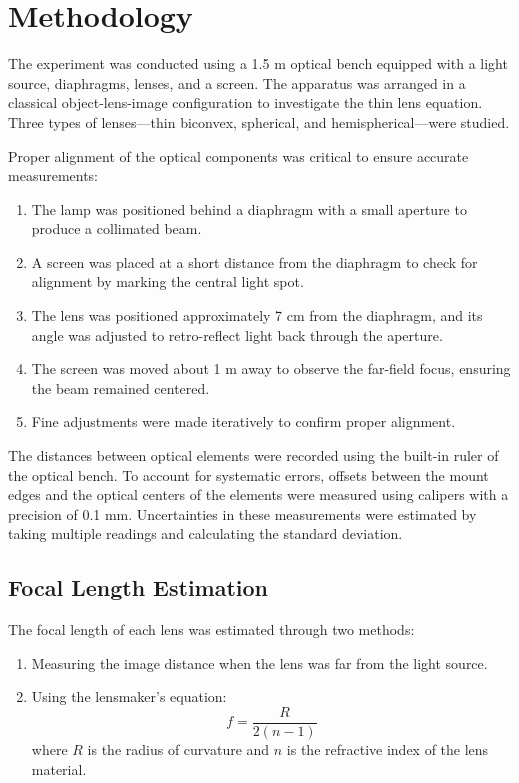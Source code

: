 \documentclass[aip, cp, amsmath, amssymb, reprint, nofootinbib]{revtex4-2}
\begin{document}
    \section{Methodology}

        The experiment was conducted using a 1.5 m optical bench equipped with a light source, diaphragms, lenses, and a screen. The apparatus was arranged in a classical object-lens-image configuration to investigate the thin lens equation. Three types of lenses—thin biconvex, spherical, and hemispherical—were studied.

        Proper alignment of the optical components was critical to ensure accurate measurements:

        \begin{enumerate}
            \item The lamp was positioned behind a diaphragm with a small aperture to produce a collimated beam.
            \item A screen was placed at a short distance from the diaphragm to check for alignment by marking the central light spot.
            \item The lens was positioned approximately 7 cm from the diaphragm, and its angle was adjusted to retro-reflect light back through the aperture.
            \item The screen was moved about 1 m away to observe the far-field focus, ensuring the beam remained centered.
            \item Fine adjustments were made iteratively to confirm proper alignment.
        \end{enumerate}


        The distances between optical elements were recorded using the built-in ruler of the optical bench. To account for systematic errors, offsets between the mount edges and the optical centers of the elements were measured using calipers with a precision of 0.1 mm. Uncertainties in these measurements were estimated by taking multiple readings and calculating the standard deviation.


        \subsection{Focal Length Estimation}
        The focal length of each lens was estimated through two methods:
        \begin{enumerate}
            \item Measuring the image distance when the lens was far from the light source.
            \item Using the lensmaker’s equation:
            \begin{equation}
                f = \frac{R}{2(n-1)}
            \end{equation}
            where $R$ is the radius of curvature and $n$ is the refractive index of the lens material.
        \end{enumerate}
\end{document}
